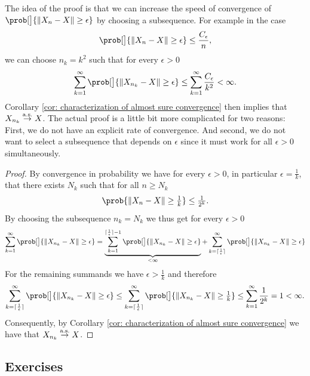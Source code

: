 The idea of the proof is that we can increase the speed of convergence
of \(\prob[\big]{\norm{X_n - X} \ge \epsilon}\) by choosing a subsequence.
For example in the case
\[
    \prob[\big]{\norm{X_n - X} \ge \epsilon} \le \frac{C_\epsilon}{n},
\]
we can choose \(n_k = k^2\) such that for every \(\epsilon > 0\)
\begin{equation}
    \label{eq: subsequence summable}    
    \sum_{k=1}^\infty \prob[\big]{\norm{X_{n_k} - X} \ge \epsilon}
    \le \sum_{k=1}^\infty \frac{C_\epsilon}{k^2} < \infty.
\end{equation}
Corollary \ref{cor: characterization of almost sure convergence} then
implies that \(X_{n_k} \overset{\operatorname{\text{a.s.}}}\to X\).
The actual proof is a little bit more complicated for two reasons: First, we do
not have an explicit rate of convergence. And second, we do not want to select a
subsequence that depends on \(\epsilon\) since it must work for all \(\epsilon >
0\) simultaneously.


\begin{proof}
    By convergence in probability we have for every \(\epsilon >0\),
    in particular \(\epsilon =\frac1k\), that
    there exists \(N_k\) such that for all \(n \ge N_k\)
    \[
        \prob{\norm{X_n - X} \ge \tfrac1k} \le \tfrac1{2^k}.
    \]
    By choosing the subsequence \(n_k = N_k\) we thus get
    for every \(\epsilon > 0\)
    \[
        \sum_{k=1}^\infty \prob[\big]{\norm{X_{n_k} - X} \ge \epsilon}
        = \underbrace{\sum_{k=1}^{\lceil \frac1\epsilon \rceil-1}
        \prob[\big]{\norm{X_{n_k} - X} \ge \epsilon}}_{< \infty}
        +\sum_{k=\lceil \frac1\epsilon \rceil}^\infty
        \prob[\big]{\norm{X_{n_k} - X} \ge \epsilon}
    \]
    For the remaining summands we have \(\epsilon > \frac1k\) and therefore
    \[
       \sum_{k=\lceil \frac1\epsilon \rceil}^\infty
        \prob[\big]{\norm{X_{n_k} - X} \ge \epsilon}
        \le \sum_{k=\lceil \frac1\epsilon \rceil}^\infty
        \prob[\big]{\norm{X_{n_k} - X} \ge \tfrac1k}
        \le \sum_{k=1}^\infty \frac1{2^k} = 1 < \infty.
    \]
    Consequently, by Corollary \ref{cor: characterization of almost sure convergence}
    we have that \(X_{n_k} \overset{\operatorname{\text{a.s.}}}\to X\).
\end{proof}

\subsection*{Exercises \thesection}







